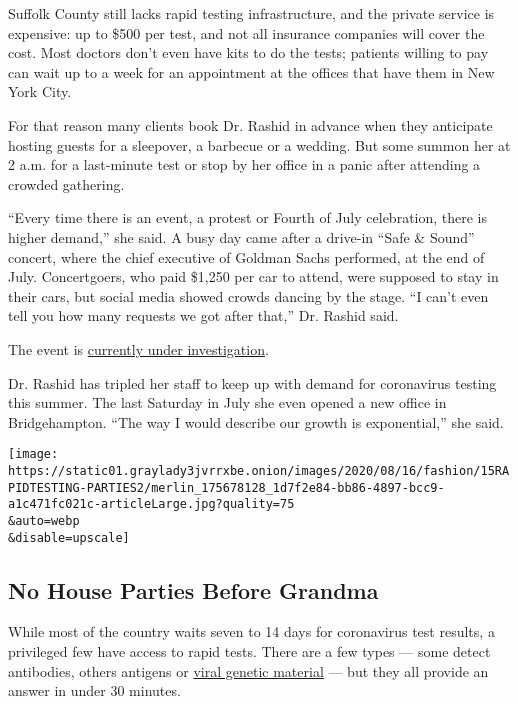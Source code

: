 Suffolk County still lacks rapid testing infrastructure, and the private
service is expensive: up to \$500 per test, and not all insurance
companies will cover the cost. Most doctors don't even have kits to do
the tests; patients willing to pay can wait up to a week for an
appointment at the offices that have them in New York City.

For that reason many clients book Dr. Rashid in advance when they
anticipate hosting guests for a sleepover, a barbecue or a wedding. But
some summon her at 2 a.m. for a last-minute test or stop by her office
in a panic after attending a crowded gathering.

``Every time there is an event, a protest or Fourth of July celebration,
there is higher demand,'' she said. A busy day came after a drive-in
``Safe \& Sound'' concert, where the chief executive of Goldman Sachs
performed, at the end of July. Concertgoers, who paid \$1,250 per car to
attend, were supposed to stay in their cars, but social media showed
crowds dancing by the stage. ``I can't even tell you how many requests
we got after that,'' Dr. Rashid said.

The event is
\href{https://www.nytimes3xbfgragh.onion/2020/07/27/nyregion/hamptons-chainsmokers-concert-social-distancing.html}{currently
under investigation}.

Dr. Rashid has tripled her staff to keep up with demand for coronavirus
testing this summer. The last Saturday in July she even opened a new
office in Bridgehampton. ``The way I would describe our growth is
exponential,'' she said.

\texttt{[image: https://static01.graylady3jvrrxbe.onion/images/2020/08/16/fashion/15RAPIDTESTING-PARTIES2/merlin\_175678128\_1d7f2e84-bb86-4897-bcc9-a1c471fc021c-articleLarge.jpg?quality=75\\\&auto=webp\\\&disable=upscale]}

\hypertarget{no-house-parties-before-grandma}{%
\subsection{No House Parties Before
Grandma}\label{no-house-parties-before-grandma}}

While most of the country waits seven to 14 days for coronavirus test
results, a privileged few have access to rapid tests. There are a few
types --- some detect antibodies, others antigens or
\href{https://www.hopkinsmedicine.org/news/newsroom/news-releases/covid-19-test-that-relies-on-viral-genetic-material-gives-false-negative-results-if-used-too-early-in-those-infected}{viral
genetic material} --- but they all provide an answer in under 30
minutes.

